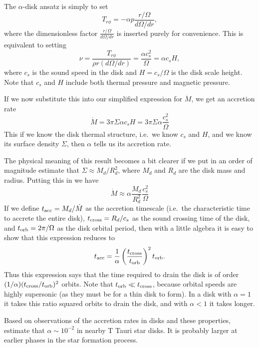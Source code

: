 The $\alpha$-disk ansatz is simply to set
\begin{equation}
T_{r\phi} = -\alpha p \frac{r/\Omega}{d\Omega/dr},
\end{equation}
where the dimensionless factor $\frac{r/\Omega}{d\Omega/dr}$ is inserted purely for convenience. This is equivalent to setting
\begin{equation}
\nu = \frac{T_{r\phi}}{\rho r (d\Omega/dr)} = \frac{\alpha c_s^2}{\Omega} = \alpha c_s H,
\end{equation}
where $c_s$ is the sound speed in the disk and $H = c_s/\Omega$ is the disk scale height. Note that $c_s$ and $H$ include both thermal pressure and magnetic pressure.

If we now substitute this into our simplified expression for $\dot{M}$, we get an accretion rate
\begin{equation}
\dot{M} = 3\pi \Sigma \alpha c_s H = 3\pi \Sigma \alpha \frac{c_s^2}{\Omega}
\end{equation}
This if we know the disk thermal structure, i.e.\ we know $c_s$ and $H$, and we know its surface density $\Sigma$, then $\alpha$ tells us its accretion rate.

The physical meaning of this result becomes a bit clearer if we put in an order of magnitude estimate that $\Sigma \approx M_d / R_d^2$, where $M_d$ and $R_d$ are the disk mass and radius. Putting this in we have
\begin{equation}
\dot{M} \approx \alpha \frac{M_d}{R_d^2} \frac{c_s^2}{\Omega}
\end{equation}
If we define $t_{\rm acc} = M_d/\dot{M}$ as the accretion timescale (i.e.\ the characteristic time to accrete the entire disk), $t_{\rm cross} = R_d/c_s$ as the sound crossing time of the disk, and $t_{\rm orb} = 2\pi/\Omega$ as the disk orbital period, then with a little algebra it is easy to show that this expression reduces to
\begin{equation}
t_{\rm acc} = \frac{1}{\alpha} \left(\frac{t_{\rm cross}}{t_{\rm orb}}\right)^2 t_{\rm orb}.
\end{equation}
Thus this expression says that the time required to drain the disk is of order $(1/\alpha)(t_{\rm cross}/t_{\rm orb})^2$ orbits. Note that $t_{\rm orb} \ll t_{\rm cross}$, because orbital speeds are highly supersonic (as they must be for a thin disk to form). In a disk with $\alpha = 1$ it takes this ratio squared orbits to drain the disk, and with $\alpha < 1$ it takes longer.

Based on observations of the accretion rates in disks and these properties, \citet{hartmann98a} estimate that $\alpha \sim 10^{-2}$ in nearby T Tauri star disks. It is probably larger at earlier phases in the star formation process.

